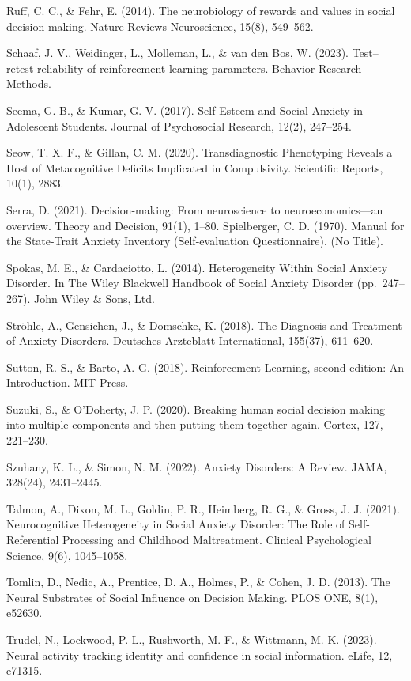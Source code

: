 \documentclass[12pt,a4paper,oneside,]{book} %
\begin{document}
Ruff, C. C., \& Fehr, E. (2014). The neurobiology of rewards and values in social decision making. Nature Reviews Neuroscience, 15(8), 549--562.

Schaaf, J. V., Weidinger, L., Molleman, L., \& van den Bos, W. (2023). Test--retest reliability of reinforcement learning parameters. Behavior Research Methods.

Seema, G. B., \& Kumar, G. V. (2017). Self-Esteem and Social Anxiety in Adolescent Students. Journal of Psychosocial Research, 12(2), 247--254.

Seow, T. X. F., \& Gillan, C. M. (2020). Transdiagnostic Phenotyping Reveals a Host of Metacognitive Deficits Implicated in Compulsivity. Scientific Reports, 10(1), 2883.

Serra, D. (2021). Decision-making: From neuroscience to neuroeconomics---an overview. Theory and Decision, 91(1), 1--80.
Spielberger, C. D. (1970). Manual for the State-Trait Anxiety Inventory (Self-evaluation Questionnaire). (No Title).

Spokas, M. E., \& Cardaciotto, L. (2014). Heterogeneity Within Social Anxiety Disorder. In The Wiley Blackwell Handbook of Social Anxiety Disorder (pp.~247--267). John Wiley \& Sons, Ltd.

Ströhle, A., Gensichen, J., \& Domschke, K. (2018). The Diagnosis and Treatment of Anxiety Disorders. Deutsches Arzteblatt International, 155(37), 611--620.

Sutton, R. S., \& Barto, A. G. (2018). Reinforcement Learning, second edition: An Introduction. MIT Press.

Suzuki, S., \& O'Doherty, J. P. (2020). Breaking human social decision making into multiple components and then putting them together again. Cortex, 127, 221--230.

Szuhany, K. L., \& Simon, N. M. (2022). Anxiety Disorders: A Review. JAMA, 328(24), 2431--2445.

Talmon, A., Dixon, M. L., Goldin, P. R., Heimberg, R. G., \& Gross, J. J. (2021). Neurocognitive Heterogeneity in Social Anxiety Disorder: The Role of Self-Referential Processing and Childhood Maltreatment. Clinical Psychological Science, 9(6), 1045--1058.

Tomlin, D., Nedic, A., Prentice, D. A., Holmes, P., \& Cohen, J. D. (2013). The Neural Substrates of Social Influence on Decision Making. PLOS ONE, 8(1), e52630.

Trudel, N., Lockwood, P. L., Rushworth, M. F., \& Wittmann, M. K. (2023). Neural activity tracking identity and confidence in social information. eLife, 12, e71315.
\end{document}
